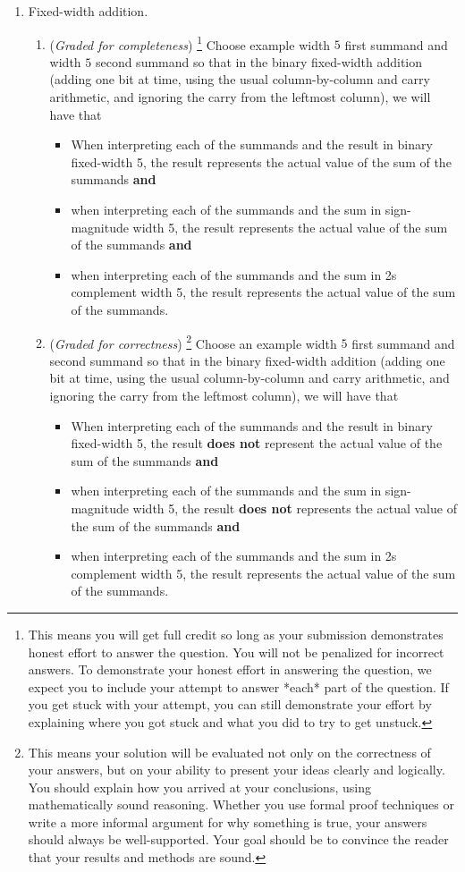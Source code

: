\documentclass[12pt, oneside]{article}
\newcommand{\gradeCorrect}{({\it Graded for correctness}) }
\newcommand{\gradeCorrectFirst}{\gradeCorrect\footnote{This means your solution 
will be evaluated not only on the correctness of your answers, but on your ability
to present your ideas clearly and logically. You should explain how you 
arrived at your conclusions, using
mathematically sound reasoning. Whether you use formal proof techniques or 
write a more informal argument
for why something is true, your answers should always be well-supported. 
Your goal should be to convince the
reader that your results and methods are sound.} }
\newcommand{\gradeComplete}{({\it Graded for completeness}) }
\newcommand{\gradeCompleteFirst}{\gradeComplete\footnote{This means you will 
get full credit so long as your submission demonstrates honest effort to 
answer the question. You will not be penalized for incorrect answers. 
To demonstrate your honest effort in answering the question, we 
expect you to include your attempt to answer *each* part of the question. 
If you get stuck with your attempt, you can still demonstrate 
your effort by explaining where you got stuck and what 
you did to try to get unstuck.} }
\begin{document}
\begin{enumerate}[labelindent=0pt, leftmargin=0pt]
        \item Fixed-width addition.  
        \begin{enumerate}
            \item\gradeCompleteFirst Choose  example width $5$ first summand and width $5$ second summand so that 
            in the  binary fixed-width addition (adding one bit at time, using 
            the usual column-by-column and carry arithmetic, and ignoring the carry 
            from the  leftmost column), we will have that
            \begin{itemize}
            \item[(1)] When interpreting each of the summands and the result in binary fixed-width 5, 
            the result represents the actual value of the sum of the summands {\bf and}
            \item[(2)] when interpreting each of the summands and the sum in sign-magnitude width 5, the result  
            represents the actual value of the sum of the summands {\bf and}
            \item[(3)] when interpreting each of the summands and the sum in 2s complement width 5, the result 
            represents the actual value of the sum of the summands.
            \end{itemize}
            \item\gradeCorrectFirst Choose an example width $5$ first summand and second summand so that 
            in the binary fixed-width addition (adding one bit at time, using 
            the usual column-by-column and carry arithmetic, and ignoring the carry 
            from the  leftmost column), we will have that
            \begin{itemize}
            \item[(1)] When interpreting each of the summands and the result in binary fixed-width 5, 
            the result {\bf does not} represent the actual value of the sum of the summands {\bf and}
            \item[(2)] when interpreting each of the summands and the sum in sign-magnitude width 5, the result  
            {\bf does not} represents the actual value of the sum of the summands {\bf and}
            \item[(3)] when interpreting each of the summands and the sum in 2s complement width 5, the result 
            represents the actual value of the sum of the summands.
            \end{itemize}

\end{enumerate}
\end{enumerate}
\end{document}
